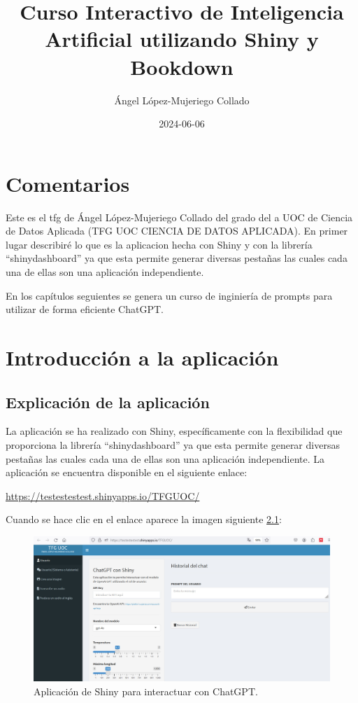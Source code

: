 \documentclass[
]{book}
\title{Curso Interactivo de Inteligencia Artificial utilizando Shiny y Bookdown}
\author{Ángel López-Mujeriego Collado}
\date{2024-06-06}
\begin{document}
\maketitle

{
\setcounter{tocdepth}{1}
\tableofcontents
}
\chapter{Comentarios}\label{comentarios}

Este es el tfg de Ángel López-Mujeriego Collado del grado del a UOC de Ciencia de Datos Aplicada (TFG UOC CIENCIA DE DATOS APLICADA). En primer lugar describiré lo que es la aplicacion hecha con Shiny y con la librería ``shinydashboard'' ya que esta permite generar diversas pestañas las cuales cada una de ellas son una aplicación independiente.

En los capítulos seguientes se genera un curso de inginiería de prompts para utilizar de forma eficiente ChatGPT.

\chapter{Introducción a la aplicación}\label{introducciuxf3n-a-la-aplicaciuxf3n}

\section{Explicación de la aplicación}\label{explicaciuxf3n-de-la-aplicaciuxf3n}

La aplicación se ha realizado con Shiny, específicamente con la flexibilidad que proporciona la librería ``shinydashboard'' ya que esta permite generar diversas pestañas las cuales cada una de ellas son una aplicación independiente. La aplicación se encuentra disponible en el siguiente enlace:

\url{https://testestestest.shinyapps.io/TFGUOC/}

Cuando se hace clic en el enlace aparece la imagen siguiente \ref{fig:CURSO-1}:

\begin{figure}

{\centering \includegraphics[width=1\linewidth]{FIG2} 

}

\caption{Aplicación de Shiny para interactuar con ChatGPT.}\label{fig:CURSO-1}
\end{figure}
\end{document}
